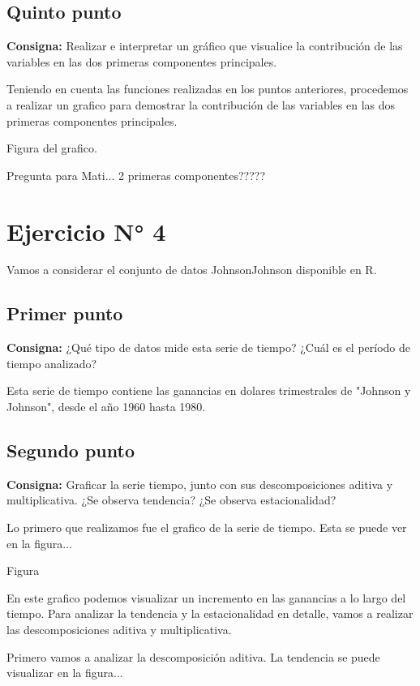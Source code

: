 \documentclass{article} %
\begin{document}
\subsection{Quinto punto}

\textbf{Consigna:} Realizar e interpretar un gráfico que visualice la contribución de las variables en las dos primeras componentes principales.

Teniendo en cuenta las funciones realizadas en los puntos anteriores, procedemos a realizar un grafico para demostrar la contribución de las variables en las dos primeras componentes principales. 


Figura del grafico.


Pregunta para Mati... 2 primeras componentes?????

\section{Ejercicio N° 4}

Vamos a considerar el conjunto de datos JohnsonJohnson disponible en R.

\subsection{Primer punto}

\textbf{Consigna:} ¿Qué tipo de datos mide esta serie de tiempo? ¿Cuál es el período de tiempo analizado?

Esta serie de tiempo contiene las ganancias en dolares trimestrales de "Johnson y Johnson", desde el año 1960 hasta 1980.

\subsection{Segundo punto}

\textbf{Consigna:} Graficar la serie tiempo, junto con sus descomposiciones aditiva y multiplicativa. ¿Se observa tendencia? ¿Se observa estacionalidad?

Lo primero que realizamos fue el grafico de la serie de tiempo. Esta se puede ver en la figura... 

Figura 


En este grafico podemos visualizar un incremento en las ganancias a lo largo del tiempo. Para analizar la tendencia y la estacionalidad en detalle, vamos a realizar las descomposiciones aditiva y multiplicativa. 

Primero vamos a analizar la descomposición aditiva. La tendencia se puede visualizar en la figura... 
\end{document}
